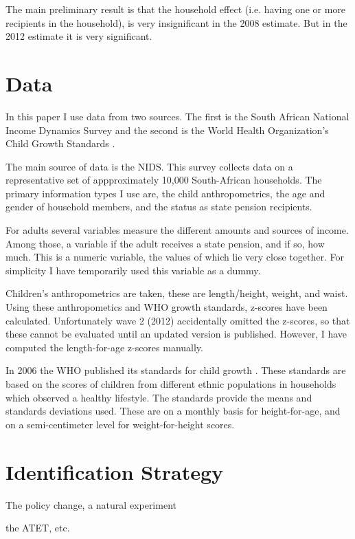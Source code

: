\documentclass[a4paper]{report}
\begin{document}
\begin{refsection}
The main preliminary result is that the household effect (i.e. having one or more recipients in the household),
is very insignificant in the 2008 estimate.
But in the 2012 estimate it is very significant.

\section{Data}
\label{sa:data}
In this paper I use data from two sources.
The first is the South African National Income Dynamics Survey \parencite[NIDS]{saldru2008nids, saldru2012nids, saldru2013nids} and the second is the World Health Organization's Child Growth Standards \parencite[WHO]{who2006child}.

The main source of data is the NIDS.
This survey collects data on a representative set of appproximately 10,000 South-African households.
The primary information types I use are, the child anthropometrics, the age and gender of household members, and the status as state pension recipients.

For adults several variables measure the different amounts and sources of income.
Among those, a variable if the adult receives a state pension, and if so, how much.
This is a numeric variable, the values of which lie very close together.
For simplicity I have temporarily used this variable as a dummy.

Children's anthropometrics are taken, these are length/height, weight, and waist.
Using these anthropometics and WHO growth standards, z-scores have been calculated.
Unfortunately wave 2 (2012) accidentally omitted the z-scores, so that these cannot be evaluated until an updated version is published.
However, I have computed the length-for-age z-scores manually.

In 2006 the WHO published its standards for child growth \parencite{who2006child}.
These standards are based on the scores of children from different ethnic populations in households which observed a healthy lifestyle.
The standards provide the means and standards deviations used. 
These are on a monthly basis for height-for-age, and on a semi-centimeter level for weight-for-height scores.

\section{Identification Strategy
\label{sa:identification}}
The policy change, a natural experiment

the ATET, etc.


\end{refsection}
\end{document}

